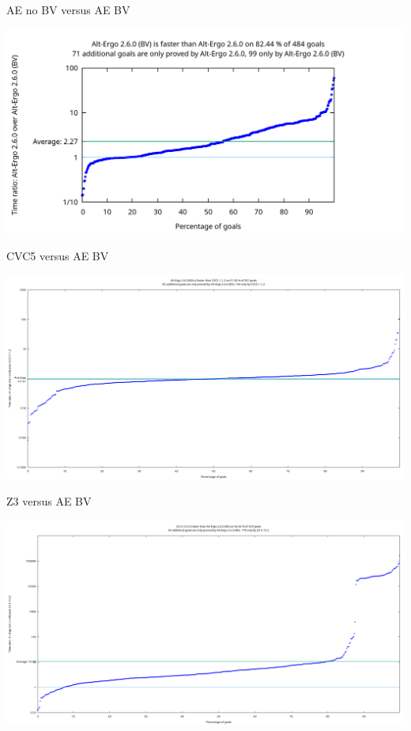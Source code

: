 \documentclass[aspectratio=169]{beamer}
\begin{document}
\begin{frame}{AE no BV versus AE BV}

  \includegraphics[width=\textwidth]{AEvsAEBV.png}

\end{frame}

\begin{frame}{CVC5 versus AE BV}

  \includegraphics[width=\textwidth]{AEBVvsCVC5.png}

\end{frame}

\begin{frame}{Z3 versus AE BV}

  \includegraphics[width=\textwidth]{Z3vsAEBV.png}

\end{frame}
\end{document}

